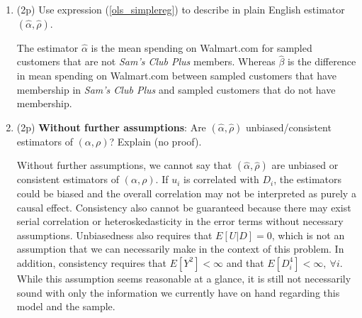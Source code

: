 \documentclass{article}
\newcommand{\gap}{\vspace{1 em}}
\begin{document}
\begin{enumerate}[label=\textbf{Q\arabic{enumi}}.,ref=Q\arabic{enumi}, wide=0pt, itemsep=1em, topsep=5pt]
\begin{enumerate}
\begin{solution}
{            finishing the exercise.
            }
        \end{solution}
        \gap
        \item (2p) Use expression (\ref{ols_simplereg}) to describe in plain English estimator $\left( \widehat{\alpha }, \widehat{\rho }\right) $.\label{item:q1-old-as-group-averages}

        \begin{solution}
            {The estimator $\hat{\alpha}$ is the mean spending on Walmart.com for sampled customers that are not \textit{Sam's Club Plus} members. Whereas $\hat{\beta}$ is the difference in mean spending on Walmart.com between sampled customers that have membership in \textit{Sam's Club Plus} and sampled customers that do not have membership.}
        \end{solution}

        \item (2p) \textbf{Without further assumptions}: Are $\left( \widehat{\alpha }, \widehat{\rho }\right) $ unbiased/consistent estimators of $\left( \alpha,\rho \right) $? Explain (no proof).

        \begin{solution}
            {
                Without further assumptions, we cannot say that $\left( \widehat{\alpha }, \widehat{\rho }\right)$ are unbiased or consistent estimators of $\left( \alpha,\rho \right)$. If $u_i$ is correlated with $D_i$, the estimators could be biased and the overall correlation may not be interpreted as purely a causal effect. Consistency also cannot be guaranteed because there may exist serial correlation or heteroskedasticity in the error terms without necessary assumptions. Unbiasedness also requires that $E[U|D] = 0$, which is not an assumption that we can necessarily make in the context of this problem. In addition, consistency requires that $E[Y^2] < \infty$ and that $E[D_i^4] < \infty, \ \forall i$. While this assumption seems reasonable at a glance, it is still not necessarily sound with only the information we currently have on hand regarding this model and the sample.
            }
        \end{solution}


\end{enumerate}
\end{enumerate}
\end{document}
